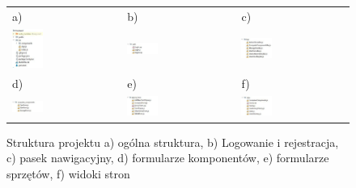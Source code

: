 \begin{figure}[htb]
  \centering
	\begin{tabular}{@{}lll@{}}
	a) & b) & c) \\
  \includegraphics[width=0.3\textwidth]{rys05/frontend/frontend.pdf} & 
	\includegraphics[width=0.3\textwidth]{rys05/frontend/auth.pdf} &
	\includegraphics[width=0.3\textwidth]{rys05/frontend/bar.pdf} \\

	d) & e) & f) \\
	\includegraphics[width=0.3\textwidth]{rys05/frontend/components.pdf} &
	\includegraphics[width=0.3\textwidth]{rys05/frontend/deviceform.pdf} &
	\includegraphics[width=0.3\textwidth]{rys05/frontend/view.pdf}
	\end{tabular}
  \caption{Struktura projektu a) ogólna struktura, b) Logowanie i rejestracja, c) pasek nawigacyjny, d) formularze komponentów, e) formularze sprzętów, f) widoki stron}
  \label{frontend_struktura:label}
\end{figure}



